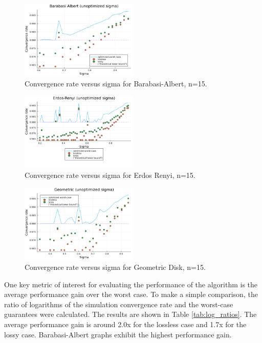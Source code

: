 \documentclass[conference]{IEEEtran}
\begin{document}
\begin {figure}[h]
    \centering
    \includegraphics[width=0.5\textwidth]{s-ba.png}
    \caption{Convergence rate versus sigma for Barabasi-Albert, n=15.}
    \label{fig:sig1}
\end{figure}

\begin {figure}[h]
    \centering
    \includegraphics[width=0.5\textwidth]{s-er.png}
    \caption{Convergence rate versus sigma for Erdos Renyi, n=15.}
    \label{fig:sig2}
\end{figure}

\begin {figure}[h]
    \centering
    \includegraphics[width=0.5\textwidth]{s-geo.png}
    \caption{Convergence rate versus sigma for Geometric Disk, n=15.}
    \label{fig:sig3}
\end{figure}

One key metric of interest for evaluating the performance of the algorithm is the average performance gain over the worst case. 
To make a simple comparison, the ratio of logarithms of the simulation convergence rate and the worst-case guarantees were calculated. The results are
shown in Table \ref{tab:log_ratios}. The average performance gain is around 2.0x for the lossless case and 1.7x for the lossy case. Barabasi-Albert graphs 
exhibit the highest performance gain. 
\end{document}
